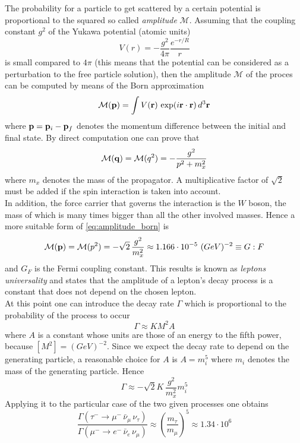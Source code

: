 The probability for a particle to get scattered by a certain potential is proportional to the squared so called \emph{amplitude} $\mathcal{M}$.
Assuming that the coupling constant $g^2$ of the Yukawa potential (atomic units)
\begin{equation*}
    V(r) = -\frac{g^2}{4\pi} \frac{e^{-r/R}}{r}
\end{equation*}
is small compared to $4\pi$ (this means that the potential can be considered as a perturbation to the free particle solution), then the amplitude $\mathcal{M}$ of the proces can be computed by means of the Born approximation
\begin{equation*}
    \mathcal{M}(\mathbf{p}) = \int V(\mathbf{r}) \, \exp(i\mathbf{r}\cdot\mathbf{r}) \, d^3\mathbf{r}
\end{equation*}
where $\mathbf{p} = \mathbf{p}_i - \mathbf{p}_f$ denotes the momentum difference between the initial and final state. By direct computation one can prove that 
\begin{equation}
    \mathcal{M}(\mathbf{q}) = \mathcal{M}(q^2) = - \frac{g^2}{p^2 + m_x^2}
    \label{eq:amplitude_born}
\end{equation}
where $m_x$ denotes the mass of the propagator. A multiplicative factor of $\sqrt{2}$ must be added if the spin interaction is taken into account. \\
In addition, the force carrier that governs the interaction is the $W$ boson, the mass of which is many times bigger than all the other involved masses. Hence a more suitable form of 
\ref{eq:amplitude_born} is 
\begin{equation*}
    \mathcal{M}(\mathbf{p}) = \mathcal{M}(p^2) = - \sqrt{2} \, \frac{g^2}{m_x^2} \approx 1.166 \cdot 10^{-5}~(GeV)^{-2} \equiv G:F
\end{equation*}
and $G_F$ is the Fermi coupling constant.
This results is known as \emph{leptons universality} and states that the amplitude of a lepton's decay process is a constant that does not depend on the chosen lepton. \\
At this point one can introduce the decay rate $\Gamma$ which is proportional to the probability of the process to occur
\begin{equation*}
    \Gamma \approx K M^2 A
\end{equation*}
where $A$ is a constant whose units are those of an energy to the fifth power, because $[M^2] = (GeV)^{-2}$. Since we expect the decay rate 
to depend on the generating particle, a reasonable choice for $A$ is $A=m_i^5$ where $m_i$ denotes the mass of the generating particle. Hence
\begin{equation*}
    \Gamma \approx - \sqrt{2} K \, \frac{g^2}{m_x^2}m_i^5
\end{equation*}
Applying it to the particular case of the two given processes one obtains
\begin{equation}
    \frac{\Gamma\left(\tau^- \rightarrow \mu^- \, \bar\nu_{\mu} \, \nu_{\tau}\right)}{\Gamma\left( \mu^- \rightarrow e^- \, \bar\nu_e \, \nu_{\mu}\right)}
    \approx \left(\frac{m_{\tau}}{m_{\mu}}\right)^5 \approx 1.34 \cdot 10^6
    \label{eq:decay_widths_ratios}
\end{equation}

